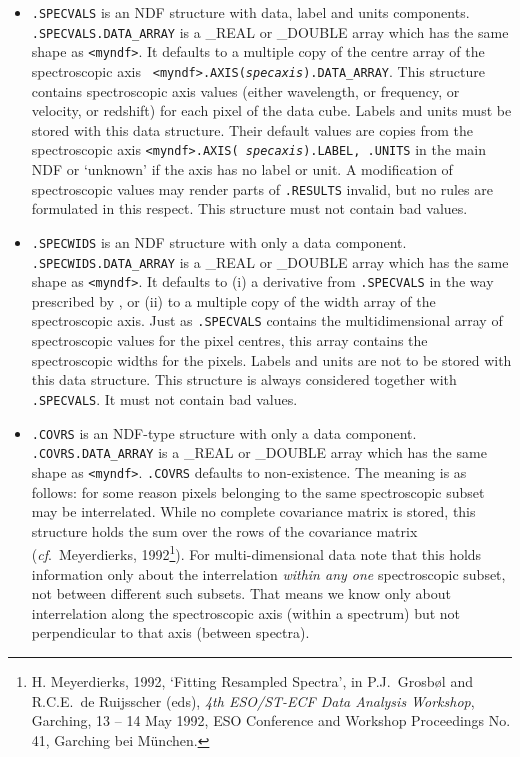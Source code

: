 \begin{itemize}
\item{\tt .SPECVALS} is an NDF structure with data, label and units
   components. {\tt .SPECVALS.\-DATA\_\-ARRAY} is a \_REAL or \_DOUBLE
   array which has the same shape as {\tt <myndf>}. It defaults to a
   multiple copy of the centre array of the spectroscopic axis {\tt
   <myndf>.AXIS\-({\it specaxis})\-.DATA\_\-ARRAY}. This structure
   contains spectroscopic axis values (either wavelength, or frequency,
   or velocity, or redshift) for each pixel of the data cube. Labels and
   units must be stored with this data structure. Their default values
   are copies from the spectroscopic axis {\tt <myndf>.AXIS({\it
   specaxis}).LABEL, .UNITS} in the main NDF or `unknown' if the axis
   has no label or unit. A modification of spectroscopic values may
   render parts of {\tt .RESULTS} invalid, but no rules are formulated
   in this respect. This structure must not contain bad values.

\item{\tt .SPECWIDS} is an NDF structure with only a data component.
   {\tt .SPECWIDS.DATA\_\-ARRAY} is a \_REAL or \_DOUBLE array which has
   the same shape as {\tt <myndf>}. It defaults to (i) a derivative from
   {\tt .SPECVALS} in the way prescribed by
,
   or (ii) to a multiple copy of the width array of the spectroscopic
   axis. Just as {\tt .SPECVALS} contains the multidimensional array of
   spectroscopic values for the pixel centres, this array contains the
   spectroscopic widths for the pixels. Labels and units are not to be
   stored with this data structure. This structure is always considered
   together with {\tt .SPECVALS}. It must not contain bad values.

\item{\tt .COVRS} is an NDF-type structure with only a data component.
   {\tt .COVRS.DATA\_ARRAY} is a \_REAL or \_DOUBLE array which has the
   same shape as {\tt <myndf>}. {\tt .COVRS} defaults to
   non-existence. The meaning is as follows: for some reason pixels
   belonging to the same spectroscopic subset may be interrelated. While
   no complete covariance matrix is stored, this structure holds the sum
   over the rows of the covariance matrix ({\it cf}.\ Meyerdierks,
   1992\footnote{H. Meyerdierks, 1992, `Fitting Resampled Spectra', in
   P.J.\ Grosb\o l and R.C.E.\ de Ruijsscher (eds), {\it 4th ESO/ST-ECF
   Data Analysis Workshop}, Garching, 13 -- 14 May 1992, ESO Conference
   and Workshop Proceedings No. 41, Garching bei M\"unchen.}). For
   multi-dimensional data note that this holds information only about
   the interrelation {\it within any one} spectroscopic subset, not
   between different such subsets. That means we know only about
   interrelation along the spectroscopic axis (within a spectrum) but
   not perpendicular to that axis (between spectra). 


\end{itemize}
